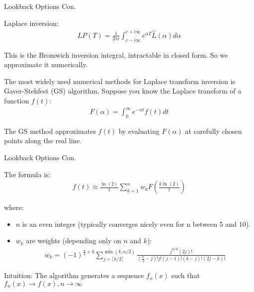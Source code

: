 \documentclass{beamer}
\begin{document}
\begin{frame}{Lookback Options Con.}


    {\footnotesize \footnotesize
    \par Laplace inversion: 
    \begin{align*}
        LP(T)  = \frac{1}{2\pi i} 
        \int_{c-i\infty}^{c+i\infty} e^{\alpha T} \hat{L}(\alpha)  d\alpha
    \end{align*}
    \par This is the Bromwich inversion integral, intractable in closed form.
     So we approximate it numerically. 
     \par The most widely used numerical methods for Laplace transform inversion is
     Gaver-Stehfest (GS) algorithm. Suppose you know the Laplace transform of a function \( f(t) \):
     \begin{align*}
        F(\alpha) = \int_{0}^{\infty} e^{-\alpha t} f(t)  dt
     \end{align*}
     \par The GS method approximates \( f(t) \) by evaluating \( F(\alpha) \) at carefully 
     chosen points along the real line.

    }
    
\end{frame}

\begin{frame}{Lookback Options Con.}


    {\footnotesize \footnotesize
    \par The formula is:
    \begin{align*}
        f(t) \approx \frac{\ln(2)}{t} \sum_{k=1}^{n} w_k F \left( \frac{k \ln(2)}{t} \right)
    \end{align*}

where:

\begin{itemize}
    \item \( n \) is an even integer (typically converges nicely even for n between 5 and 10).
    \item \( w_k \) are weights (depending only on \( n \) and \( k \)):
    \begin{align*}
        w_k = (-1)^{\frac{n}{2}+k} \sum_{j=\lceil k/2 \rceil}^{\min(k,n/2)} 
        \frac{j^{n/2}(2j)!}{(\frac{n}{2}-j)! j! (j-1)! (k-j)! (2j-k)!}
    \end{align*}
\end{itemize}
\par Intuition: The algorithm generates a sequence \( f_n(x) \) such that \( f_n(x) \to f(x),  n \to \infty \)

    }
\end{frame}
\end{document}
